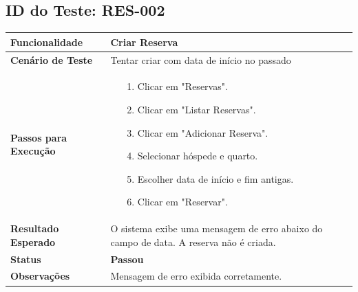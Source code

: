 \documentclass[
	12pt,				%
	openany,			%
	oneside,			%
	a4paper,			%
	english,			%
	french,				%
	spanish,			%
	brazil				%
	]{abntex2}
\begin{document}
\begin{apendicesenv}
\subsection*{ID do Teste: RES-002}
\begin{tabular}{@{} p{5cm} p{11cm} @{}}
	\toprule
	\textbf{Funcionalidade} & Criar Reserva \\
	\midrule
	\textbf{Cenário de Teste} & Tentar criar com data de início no passado \\
	\midrule
	\textbf{Passos para Execução} &
	\begin{itemize} \itemsep0em 
		\item[1.] Clicar em "Reservas".
		\item[2.] Clicar em "Listar Reservas".
		\item[3.] Clicar em "Adicionar Reserva".
		\item[4.] Selecionar hóspede e quarto.
		\item[5.] Escolher data de início e fim antigas.
		\item[6.] Clicar em "Reservar".
	\end{itemize} \\
	\midrule
	\textbf{Resultado Esperado} & O sistema exibe uma mensagem de erro abaixo do campo de data. A reserva não é criada. \\
	\midrule
	\textbf{Status} & \textbf{Passou} \\
	\midrule
	\textbf{Observações} & Mensagem de erro exibida corretamente. \\
	\bottomrule
\end{tabular}
\vspace{1cm}


\end{apendicesenv}
\end{document}
